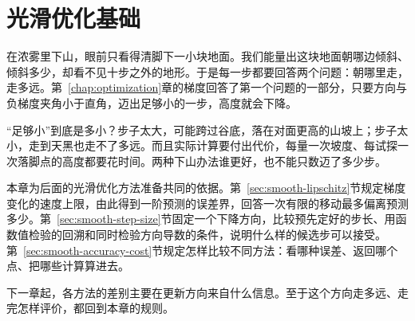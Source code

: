 \chapter{光滑优化基础}
\label{chap:smooth-foundations}
\label{chap:smooth-optimization}

在浓雾里下山，眼前只看得清脚下一小块地面。我们能量出这块地面朝哪边倾斜、倾斜多少，却看不见十步之外的地形。于是每一步都要回答两个问题：朝哪里走，走多远。第~\ref{chap:optimization}章的梯度回答了第一个问题的一部分，只要方向与负梯度夹角小于直角，迈出足够小的一步，高度就会下降。

“足够小”到底是多小？步子太大，可能跨过谷底，落在对面更高的山坡上；步子太小，走到天黑也走不了多远。而且实际计算要付出代价，每量一次坡度、每试探一次落脚点的高度都要花时间。两种下山办法谁更好，也不能只数迈了多少步。

本章为后面的光滑优化方法准备共同的依据。第~\ref{sec:smooth-lipschitz}节规定梯度变化的速度上限，由此得到一阶预测的误差界，回答一次有限的移动最多偏离预测多少。第~\ref{sec:smooth-step-size}节固定一个下降方向，比较预先定好的步长、用函数值检验的回溯和同时检验方向导数的条件，说明什么样的候选步可以接受。第~\ref{sec:smooth-accuracy-cost}节规定怎样比较不同方法：看哪种误差、返回哪个点、把哪些计算算进去。

下一章起，各方法的差别主要在更新方向来自什么信息。至于这个方向走多远、走完怎样评价，都回到本章的规则。





